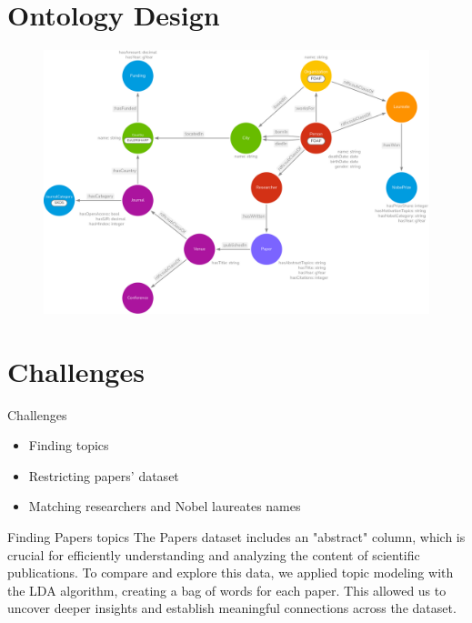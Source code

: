 \documentclass[aspectratio=169,xcolor=dvipsnames]{beamer}
\begin{document}
\section{Ontology Design}

\begin{frame}
	\begin{figure}
		\includegraphics[width=0.75\linewidth]{../nobelOntologyTransparent.png}
	\end{figure}
\end{frame}

\section{Challenges}

\begin{frame}{Challenges}
	\begin{itemize}
		\item Finding topics
		      \vspace{1em}
		\item Restricting papers' dataset
		      \vspace{1em}
		\item Matching researchers and Nobel laureates names
	\end{itemize}
\end{frame}

\begin{frame}{Finding Papers topics}
	The Papers dataset includes an "abstract" column, which is crucial for efficiently understanding
	and analyzing the content of scientific publications. To compare and explore this data, we applied
	topic modeling with the LDA algorithm, creating a bag of words for each paper. This allowed us to
	uncover deeper insights and establish meaningful connections across the dataset.
\end{frame}
\end{document}
